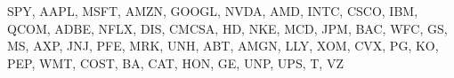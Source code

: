 SPY, AAPL, MSFT, AMZN, GOOGL, NVDA, AMD, INTC, CSCO, IBM, QCOM, ADBE, NFLX, DIS, CMCSA, HD, NKE, MCD, JPM, BAC, WFC, GS, MS, AXP, JNJ, PFE, MRK, UNH, ABT, AMGN, LLY, XOM, CVX, PG, KO, PEP, WMT, COST, BA, CAT, HON, GE, UNP, UPS, T, VZ
